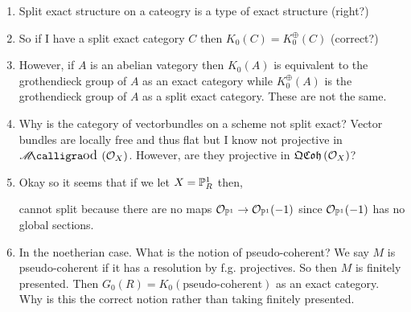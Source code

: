 \documentclass[12pt]{extarticle}
\begin{document}
\begin{enumerate}
\item Split exact structure on a cateogry is a type of exact structure (right?)
\item So if I have a split exact category $C$ then $K_0(C) = K_0^\oplus(C)$ (correct?)
\item However, if $A$ is an abelian vategory then $K_0(A)$ is equivalent to the grothendieck group of $A$ as an exact category while $K_0^\oplus(A)$ is the grothendieck group of $A$ as a split exact category. These are not the same.
\item Why is the category of vectorbundles on a scheme not split exact? Vector bundles are locally free and thus flat but I know not projective in $\shMod{\struct{X}}$. However, are they projective in $\QCoh{\struct{X}}$? 
\item Okay so it seems that if we let $X = \P^1_R$ then,
\begin{center}
\end{center}
cannot split because there are no maps $\struct{\P^1} \to \struct{\P^1}(-1)$ since $\struct{\P^1}(-1)$ has no global sections.
\item In the noetherian case. What is the notion of pseudo-coherent? We say $M$ is pseudo-coherent if it has a resolution by f.g. projectives. So then $M$ is finitely presented. Then $G_0(R) = K_0(\text{pseudo-coherent})$ as an exact category. Why is this the correct notion rather than taking finitely presented. 
\end{enumerate}
\end{document}
